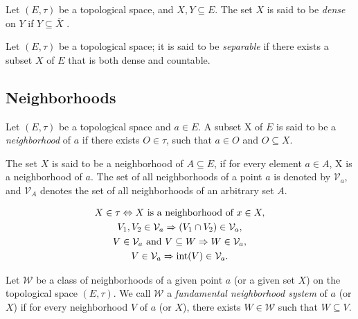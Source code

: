 \begin{definition}
	Let $(E,\tau)$ be a topological space, and $X, Y \subseteq E$. The set $X$ is said to be \emph{dense} on $Y$ if $Y \subseteq \overline{X}$ .
\end{definition}


\begin{definition}
	Let $(E, \tau)$ be a topological space; it is said to be \emph{separable} if there exists a subset $X$ of $E$ that is both dense and countable.
\end{definition}

\subsection{Neighborhoods}

\begin{definition}
	Let $(E, \tau)$ be a topological space and $a \in E$. A subset X of $E$ is said to be a \emph{neighborhood} of $a$ if there exists $O \in \tau$, such that $a \in O$ and $O \subseteq X$. \par
	The set $X$ is said to be a neighborhood of $A \subseteq E$, if for every element $a \in A$, X is a neighborhood of $a$. The set of all neighborhoods of a point $a$ is denoted by $\mathcal{V}_a$, and $\mathcal{V}_A$ denotes the set of all neighborhoods of an arbitrary set $A$. 
\end{definition}

\begin{proposition}
	\begin{gather*}
		X \in \tau \Leftrightarrow X \text{ is a neighborhood of } x \in X, \\
		V_1, V_2 \in \mathcal{V}_a \Rightarrow (V_1 \cap V_2) \in \mathcal{V}_a, \\
		V \in \mathcal{V}_a \text{ and } V \subseteq W \Rightarrow W \in \mathcal{V}_a, \\
		V \in \mathcal{V}_a \Rightarrow \operatorname{int}(V) \in \mathcal{V}_a.
	\end{gather*}
\end{proposition}

\begin{definition}
	Let $\mathcal{W}$ be a class of neighborhoods of a given point $a$ (or a given set $X$) on the topological space $(E, \tau)$. We call $\mathcal{W}$ a \emph{fundamental neighborhood system} of $a$ (or $X$) if for every neighborhood $V$ of $a$ (or $X$), there exists $W \in \mathcal{W}$ such that $W \subseteq V$.  
\end{definition}

